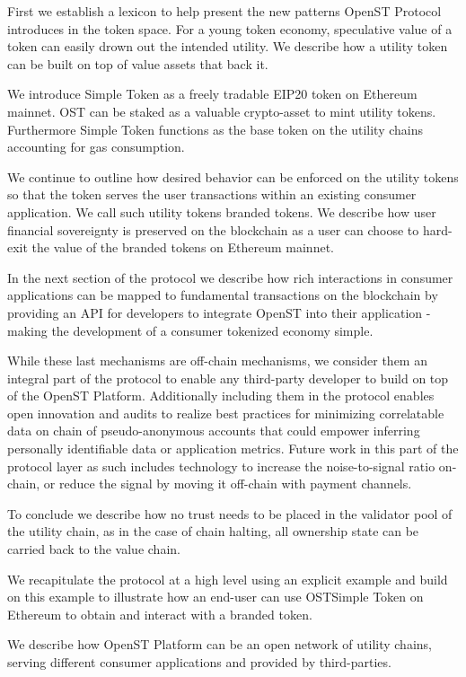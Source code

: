 \documentclass[12pt,a4paper, twocolumn]{article}
\begin{document}
First we establish a lexicon to help present the new patterns OpenST Protocol introduces in the token space.  For a young token economy, speculative value of a token can easily drown out the intended utility.  We describe how a utility token can be built on top of value assets that back it.\par
We introduce Simple Token as a freely tradable EIP20 token on Ethereum mainnet.  OST can be staked as a valuable crypto-asset to mint utility tokens.  Furthermore  Simple Token functions as the base token on the utility chains accounting for gas consumption. \par
We continue to outline how desired behavior can be enforced on the utility tokens so that the token serves the user transactions within an existing consumer application.  We call such utility tokens branded tokens.  We describe how user financial sovereignty is preserved on the blockchain as a user can choose to hard-exit the value of the branded tokens on Ethereum mainnet. \par
In the next section of the protocol we describe how rich interactions in consumer applications can be mapped to fundamental transactions on the blockchain by providing an API for developers to integrate OpenST into their application - making the development of a consumer tokenized economy simple. \par
While these last mechanisms are off-chain mechanisms, we consider them an integral part of the protocol to enable any third-party developer to build on top of the OpenST Platform.  Additionally including them in the protocol enables open innovation and audits to realize best practices for minimizing correlatable data on chain of pseudo-anonymous accounts that could empower inferring personally identifiable data or application metrics.  Future work in this part of the protocol layer as such includes technology to increase the noise-to-signal ratio on-chain, or reduce the signal by moving it off-chain with payment channels. \par
To conclude we describe how no trust needs to be placed in the validator pool of the utility chain, as in the case of chain halting, all ownership state can be carried back to the value chain.\par
We recapitulate the protocol at a high level using an explicit example and build on this example to illustrate how an end-user can use OSTSimple Token on Ethereum to obtain and interact with a branded token.\par
We describe how OpenST Platform can be an open network of utility chains, serving different consumer applications and provided by third-parties.\par
\end{document}
